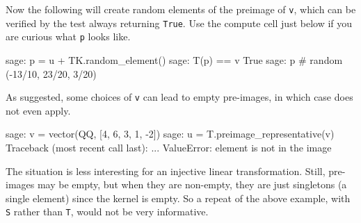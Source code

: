 %
Now the following will create random elements of the preimage of \verb?v?, which can be verified by the test always returning \verb?True?.  Use the compute cell just below if you are curious what \verb?p? looks like.
%
\begin{sageexample}
sage: p = u + TK.random_element()
sage: T(p) == v
True
sage: p                 # random
(-13/10, 23/20, 3/20)
\end{sageexample}
%
As suggested, some choices of \verb?v? can lead to empty pre-images, in which case  does not even apply.
%
\begin{sageexample}
sage: v = vector(QQ, [4, 6, 3, 1, -2])
sage: u = T.preimage_representative(v)
Traceback (most recent call last):
...
ValueError: element is not in the image
\end{sageexample}
%
The situation is less interesting for an injective linear transformation.  Still, pre-images may be empty, but when they are non-empty, they are just singletons (a single element) since the kernel is empty.  So a repeat of the above example, with \verb?S? rather than \verb?T?, would not be very informative.
%
\begin{sageverbatim}
\end{sageverbatim}
%
